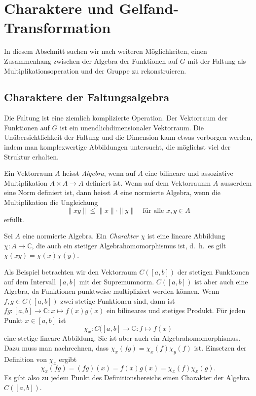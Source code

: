 %
%
%
\section{Charaktere und Gelfand-Transformation
\label{buch:gruppen:section:gelfand}}
In diesem Abschnitt suchen wir nach weiteren Möglichkeiten, einen
Zusammenhang zwischen der Algebra der Funktionen auf $G$ mit der Faltung
als Multiplikationsoperation und der Gruppe zu rekonstruieren.

%
%
\subsection{Charaktere der Faltungsalgebra}
Die Faltung ist eine ziemlich komplizierte Operation.
Der Vektorraum der Funktionen auf $G$ ist ein unendlichdimensionaler
Vektorraum.
Die Unübersichtlichkeit der Faltung und die Dimension kann etwas
vorborgen werden, indem man komplexwertige Abbildungen untersucht,
die möglichst viel der Struktur erhalten.

\begin{definition}
Ein Vektorraum $A$ heisst {\em Algebra}, wenn auf $A$ eine bilineare
und assoziative Multiplikation $A\times A\to A$ definiert ist.
Wenn auf dem Vektorraunm $A$ ausserdem eine Norm definiert ist, dann
heisst $A$ eine normierte Algebra, wenn die Multiplikation die
Ungleichung
\[
\| xy \| \le \|x\|\cdot \|y\|\quad\text{für alle $x,y\in A$}
\]
erfüllt.
\end{definition}

\begin{definition}
Sei $A$ eine normierte Algebra.
Ein {\em Charakter} $\chi$ ist eine lineare Abbildung
$\chi\colon A\to\mathbb{C}$,
%
die auch ein stetiger Algebrahomomorphismus ist, d.~h.~es gilt
$\chi(xy)=\chi(x)\chi(y)$.
\end{definition}

Als Beispiel betrachten wir den Vektorraum $C([a,b])$ der stetigen Funktionen
auf dem Intervall $[a,b]$ mit der Supremumnorm.
$C([a,b])$ ist aber auch eine Algebra, da Funktionen punktweise
multipliziert werden können.
Wenn $f,g\in C([a,b])$ zwei stetige Funktionen sind, dann ist
$fg\colon [a,b]\to\mathbb{C}:x\mapsto f(x)g(x)$ ein bilineares und
stetiges Produkt.
Für jeden Punkt $x\in[a,b]$ ist
\[
\chi_x
\colon
C([a,b] \to \mathbb{C}
:
f\mapsto f(x)
\]
eine stetige lineare Abbildung.
Sie ist aber auch ein Algebrahomomorphismus.
Dazu muss man nachrechnen, dass $\chi_x(fg)=\chi_x(f)\chi_y(f)$ ist.
Einsetzen der Definition von $\chi_x$ ergibt
\[
\chi_x(fg)
=
(fg)(x)
=
f(x)g(x)
=
\chi_x(f)\chi_x(g).
\]
Es gibt also zu jedem Punkt des Definitionsbereichs einen Charakter
der Algebra $C([a,b])$.

